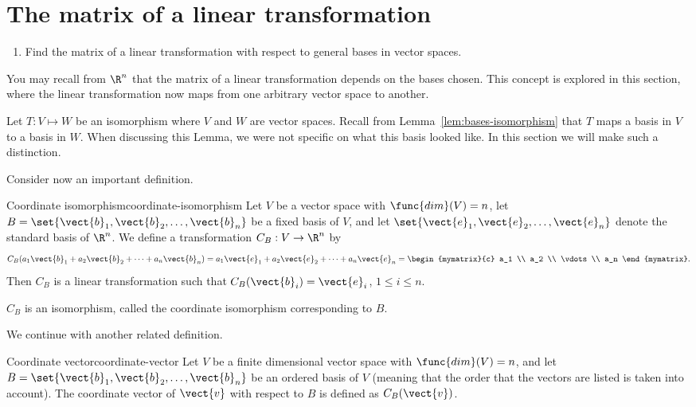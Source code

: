 \section{The matrix of a linear transformation}

\begin{outcome}
  \begin{enumerate}
  \item Find the matrix of a linear transformation with respect to
    general bases in vector spaces.
  \end{enumerate}
\end{outcome}

You may recall from $\R^n$ that the matrix of a linear transformation depends on the bases chosen. This concept is explored in this section, where the linear transformation now maps from one arbitrary vector space to another. 

Let $T: V \mapsto W$ be an isomorphism where $V$ and $W$ are vector spaces. Recall from Lemma~\ref{lem:bases-isomorphism} that $T$ maps a basis in $V$ to a basis in $W$. When discussing this Lemma, we were not specific on what this basis looked like. In this section we will make such a distinction. 

Consider now an important definition.

\begin{definition}{Coordinate isomorphism}{coordinate-isomorphism}
Let $V$ be a vector space with $\func{dim}(V)=n$, let $B=\set{\vect{b}_1, \vect{b}_2, \ldots, \vect{b}_n}$ be a fixed basis of $V$,
and let $\set{\vect{e}_1, \vect{e}_2, \ldots, \vect{e}_n}$
denote the standard basis of $\R^n$.
We define a transformation $C_B:V\to\R^n$ by
\[
C_B(a_1\vect{b}_1 + a_2\vect{b}_2 + \cdots + a_n\vect{b}_n)
=
a_1\vect{e}_1 + a_2\vect{e}_2 + \cdots + a_n\vect{e}_n
=
\begin{mymatrix}{c} a_1 \\ a_2 \\ \vdots \\ a_n
\end{mymatrix}.\]
Then $C_B$ is a linear transformation
such that
$C_B(\vect{b}_i)=\vect{e}_i$, $1\leq i\leq n$.

$C_B$ is an isomorphism, called
the coordinate isomorphism corresponding to $B$.
\end{definition}

We continue with another related definition.

\begin{definition}{Coordinate vector}{coordinate-vector}
Let $V$ be a finite dimensional vector space with $\func{dim}(V)=n$, and
let $B=\set{\vect{b}_1, \vect{b}_2, \ldots, \vect{b}_n}$ be an ordered basis of $V$ (meaning that the order that the
vectors are listed is taken into account).
The coordinate vector of $\vect{v}$ with respect to $B$ is defined
as $C_B(\vect{v})$.
\end{definition}

